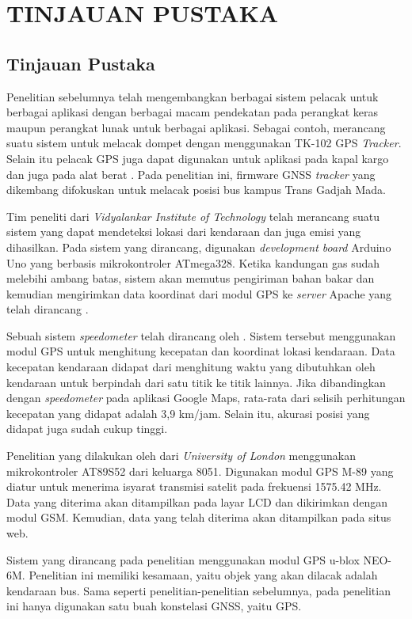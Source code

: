 \chapter{TINJAUAN PUSTAKA}

\section{Tinjauan Pustaka}
Penelitian sebelumnya telah mengembangkan berbagai sistem pelacak untuk berbagai aplikasi dengan berbagai macam pendekatan pada perangkat keras maupun perangkat lunak untuk berbagai aplikasi. Sebagai contoh, \cite{Ekhsan2022} merancang suatu sistem untuk melacak dompet dengan menggunakan TK-102 GPS \textit{Tracker}. Selain itu pelacak GPS juga dapat digunakan untuk aplikasi pada kapal kargo dan juga pada alat berat \cite{Zhang2013, Rani2021}. Pada penelitian ini, firmware GNSS \textit{tracker} yang dikembang difokuskan untuk melacak posisi bus kampus Trans Gadjah Mada.

Tim peneliti dari \textit{Vidyalankar Institute of Technology} telah merancang suatu sistem yang dapat mendeteksi lokasi dari kendaraan dan juga emisi  yang dihasilkan. Pada sistem yang dirancang, digunakan \textit{development board} Arduino Uno yang berbasis mikrokontroler ATmega328. Ketika kandungan gas  sudah melebihi ambang batas, sistem akan memutus pengiriman bahan bakar dan kemudian mengirimkan data koordinat dari modul GPS ke \textit{server} Apache yang telah dirancang \cite{Asha2022}.

Sebuah sistem \textit{speedometer} telah dirancang oleh \cite{Najmurrokhman2021}. Sistem tersebut menggunakan modul GPS untuk menghitung kecepatan dan koordinat lokasi kendaraan. Data kecepatan kendaraan didapat dari menghitung waktu yang dibutuhkan oleh kendaraan untuk berpindah dari satu titik ke titik lainnya. Jika dibandingkan dengan \textit{speedometer} pada aplikasi Google Maps, rata-rata dari selisih perhitungan kecepatan yang didapat adalah 3,9 km/jam. Selain itu, akurasi posisi yang didapat juga sudah cukup tinggi.

Penelitian yang dilakukan oleh \cite{Mukhtar2015} dari \textit{University of London} menggunakan mikrokontroler AT89S52 dari keluarga 8051. Digunakan modul GPS M-89 yang diatur untuk menerima isyarat transmisi satelit pada frekuensi 1575.42 MHz. Data yang diterima akan ditampilkan pada layar LCD dan dikirimkan dengan modul GSM. Kemudian, data yang telah diterima akan ditampilkan pada situs web.

Sistem yang dirancang pada penelitian \cite{Widya2016} menggunakan modul GPS u-blox NEO-6M. Penelitian ini memiliki kesamaan, yaitu objek yang akan dilacak adalah kendaraan bus. Sama seperti penelitian-penelitian sebelumnya, pada penelitian ini hanya digunakan satu buah konstelasi GNSS, yaitu GPS.

